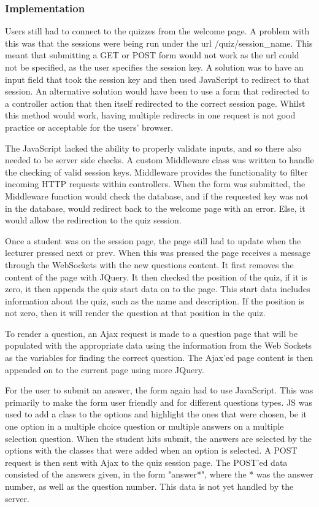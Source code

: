 \subsubsection{Implementation}
Users still had to connect to the quizzes from the welcome page. A problem with this was that the sessions were being run under the url /quiz/session\_name. This meant that submitting a GET or POST form would not work as the url could not be specified, as the user specifies the session key. A solution was to have an input field that took the session key and then used JavaScript to redirect to that session. An alternative solution would have been to use a form that redirected to a controller action that then itself redirected to the correct session page. Whilst this method would work, having multiple redirects in one request is not good practice or acceptable for the users' browser.

The JavaScript lacked the ability to properly validate inputs, and so there also needed to be server side checks. A custom Middleware class was written to handle the checking of valid session keys. Middleware provides the functionality to filter incoming HTTP requests within controllers\cite{laravel-middleware}. When the form was submitted, the Middleware function would check the database, and if the requested key was not in the database, would redirect back to the welcome page with an error. Else, it would allow the redirection to the quiz session.

Once a student was on the session page, the page still had to update when the lecturer pressed next or prev. When this was pressed the page receives a message through the WebSockets with the new questions content. It first removes the content of the page with JQuery. It then checked the position of the quiz, if it is zero, it then appends the quiz start data on to the page. This start data includes information about the quiz, such as the name and description. If the position is not zero, then it will render the question at that position in the quiz.

To render a question, an Ajax request is made to a question page that will be populated with the appropriate data using the information from the Web Sockets as the variables for finding the correct question. The Ajax'ed page content is then appended on to the current page using more JQuery.

For the user to submit an answer, the form again had to use JavaScript. This was primarily to make the form user friendly and for different questions types. JS was used to add a class to the options and highlight the ones that were chosen, be it one option in a multiple choice question or multiple answers on a multiple selection question. When the student hits submit, the answers are selected by the options with the classes that were added when an option is selected. A POST request is then sent with Ajax to the quiz session page. The POST'ed data consisted of the answers given, in the form "answer*", where the * was the answer number, as well as the question number. This data is not yet handled by the server.

